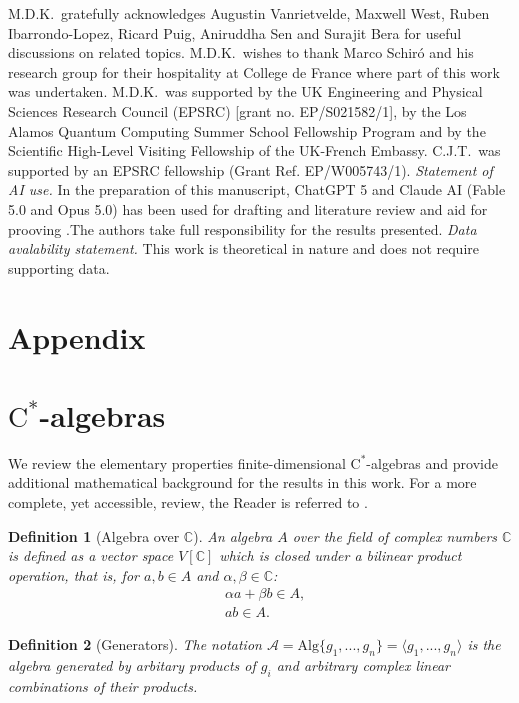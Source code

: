 \documentclass[11pt, twocolumn, floatfix, superscriptaddress, aps, prb, raggedbottom]{revtex4-2}
\newtheorem{definition}{Definition}[section]
\begin{document}
M.D.K.~gratefully acknowledges Augustin Vanrietvelde, Maxwell West, Ruben Ibarrondo-Lopez, Ricard Puig, Aniruddha Sen and Surajit Bera for useful discussions on related topics. M.D.K.~wishes to thank Marco Schiró and his research group for their hospitality at College de France where part of this work was undertaken. M.D.K.~was supported by the UK Engineering and Physical Sciences Research Council (EPSRC) [grant no.  EP/S021582/1], by the Los Alamos Quantum Computing Summer School Fellowship Program and by the Scientific High-Level Visiting Fellowship of the UK-French Embassy. C.J.T.~was supported by an EPSRC fellowship (Grant Ref. EP/W005743/1). \textit{Statement of AI use.} In the preparation of this manuscript, ChatGPT 5 and Claude AI (Fable 5.0 and Opus 5.0) has been used for drafting and literature review and aid for prooving .The authors take full responsibility for the results presented. \textit{Data avalability statement.} This work is theoretical in nature and does not require supporting data.
\appendix
\section*{Appendix}

\section{$\mathrm{C}^*$-algebras \label{app:algebras}}
We review the elementary properties finite-dimensional $\mathrm{C}^*$-algebras and provide additional mathematical background for the results in this work. For a more complete, yet accessible, review, the Reader is referred to \cite{Harlow2017, Landsman1998_notes, Jones2020, Bény2020}.

\begin{definition}[Algebra over $\mathds{C}$]
 An algebra $A$ over the field of complex numbers $\mathds{C}$ is defined as a vector space $V[\mathds{C}]$ which is closed under a bilinear product operation, that is, for $a, b \in A$ and $\alpha, \beta \in \mathds{C}$:
 \begin{align}
     &\alpha a + \beta b \in A, \\
     & a b \in A.
 \end{align}
 \end{definition}


\begin{definition}[Generators]
    The notation $\mathcal{A} =\mathrm{Alg}\{g_1, ..., g_n \}= \langle g_1, ..., g_n \rangle$ is the algebra generated by arbitary products of $g_i$ and arbitrary complex linear combinations of their products.
\end{definition}
\end{document}
